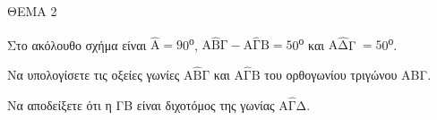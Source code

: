 
ΘΕΜΑ 2

Στο ακόλουθο σχήμα είναι $\widehat{\text{Α}} = \text{9}$0\textsuperscript{ο}, $\text{Α}\widehat{\text{Β}}\text{Γ} - \text{Α}\widehat{\text{Γ}}\text{Β} = 5$0\textsuperscript{ο} και $\text{Α}\widehat{\text{Δ}}$Γ$\  = 5$0\textsuperscript{ο}.

\begin{alist}
\item Να υπολογίσετε τις οξείες γωνίες $\text{Α}\widehat{\text{Β}}\text{Γ}$ και $\text{Α}\widehat{\text{Γ}}\text{Β}$ του ορθογωνίου τριγώνου ΑΒΓ.


\item Nα αποδείξετε ότι η ΓΒ είναι διχοτόμος της γωνίας Α$\widehat{\text{Γ}}\text{Δ}$.



\end{alist}
